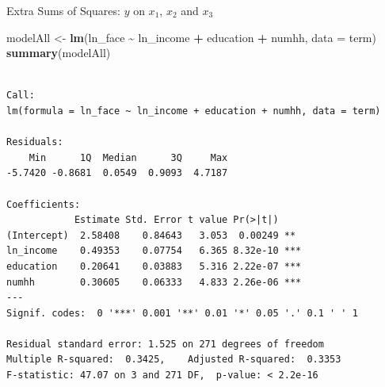 \documentclass[
  ignorenonframetext,
]{beamer}
\newenvironment{Shaded}{\begin{snugshade}}{\end{snugshade}}
\newcommand{\AttributeTok}[1]{\textcolor[rgb]{0.13,0.29,0.53}{#1}}
\newcommand{\FunctionTok}[1]{\textcolor[rgb]{0.13,0.29,0.53}{\textbf{#1}}}
\newcommand{\NormalTok}[1]{#1}
\newcommand{\OtherTok}[1]{\textcolor[rgb]{0.56,0.35,0.01}{#1}}
\newcommand{\SpecialCharTok}[1]{\textcolor[rgb]{0.81,0.36,0.00}{\textbf{#1}}}
\begin{document}
\begin{frame}[fragile]{Extra Sums of Squares: \(y\) on \(x_1\), \(x_2\)
and \(x_3\)}
\label{extra-sums-of-squares-y-on-x_1-x_2-and-x_3}
\scriptsize

\begin{Shaded}
\begin{Highlighting}[]
\NormalTok{modelAll }\OtherTok{\textless{}{-}} \FunctionTok{lm}\NormalTok{(ln\_face }\SpecialCharTok{\textasciitilde{}}\NormalTok{ ln\_income }\SpecialCharTok{+}\NormalTok{ education }\SpecialCharTok{+}\NormalTok{ numhh, }\AttributeTok{data =}\NormalTok{ term)}
\FunctionTok{summary}\NormalTok{(modelAll)}
\end{Highlighting}
\end{Shaded}

\begin{verbatim}

Call:
lm(formula = ln_face ~ ln_income + education + numhh, data = term)

Residuals:
    Min      1Q  Median      3Q     Max 
-5.7420 -0.8681  0.0549  0.9093  4.7187 

Coefficients:
            Estimate Std. Error t value Pr(>|t|)    
(Intercept)  2.58408    0.84643   3.053  0.00249 ** 
ln_income    0.49353    0.07754   6.365 8.32e-10 ***
education    0.20641    0.03883   5.316 2.22e-07 ***
numhh        0.30605    0.06333   4.833 2.26e-06 ***
---
Signif. codes:  0 '***' 0.001 '**' 0.01 '*' 0.05 '.' 0.1 ' ' 1

Residual standard error: 1.525 on 271 degrees of freedom
Multiple R-squared:  0.3425,    Adjusted R-squared:  0.3353 
F-statistic: 47.07 on 3 and 271 DF,  p-value: < 2.2e-16
\end{verbatim}

\normalsize
\end{frame}
\end{document}
